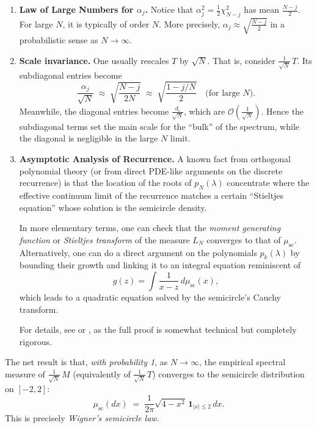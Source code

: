 \documentclass[letterpaper,11pt,oneside,reqno]{article}
\numberwithin{equation}{section}
\theoremstyle{definition}
\begin{document}
\begin{enumerate}[1.]
\item \textbf{Law of Large Numbers for \(\alpha_j\).}
   Notice that \(\alpha_j^2 = \tfrac{1}{2}\chi^2_{N-j}\) has mean \(\tfrac{N-j}{2}\).  For large \(N\), it is typically of order \(N\).  More precisely, \(\alpha_j \approx \sqrt{\tfrac{N-j}{2}}\) in a probabilistic sense as \(N\to\infty\).

\item \textbf{Scale invariance.}
   One usually rescales \(T\) by \(\sqrt{N}\).  That is, consider \(\tfrac{1}{\sqrt{N}}\,T\).  Its subdiagonal entries become
   \[
     \frac{\alpha_j}{\sqrt{N}}
     \;\approx\;
     \sqrt{\frac{N-j}{2N}}
     \;\approx\;
     \sqrt{\frac{1-j/N}{2}}
     \quad\text{(for large }N\text{)}.
   \]
   Meanwhile, the diagonal entries become \(\tfrac{d_i}{\sqrt{N}}\), which are \(\mathcal{O}(\tfrac{1}{\sqrt{N}})\).  Hence the subdiagonal terms set the main scale for the “bulk” of the spectrum, while the diagonal is negligible in the large \(N\) limit.

\item \textbf{Asymptotic Analysis of Recurrence.}
   A known fact from orthogonal polynomial theory (or from direct PDE-like arguments on the discrete recurrence) is that the location of the roots of \(p_N(\lambda)\) concentrate where the effective continuum limit of the recurrence matches a certain “Stieltjes equation” whose solution is the semicircle density.

   In more elementary terms, one can check that the \emph{moment generating function} or \emph{Stieltjes transform} of the measure \(L_N\) converges to that of \(\mu_{\mathrm{sc}}\).  Alternatively, one can do a direct argument on the polynomials \(p_k(\lambda)\) by bounding their growth and linking it to an integral equation reminiscent of
   \[
     g(z) = \int \frac{1}{x-z}\,d\mu_{\mathrm{sc}}(x),
   \]
   which leads to a quadratic equation solved by the semicircle’s Cauchy transform.

   For details, see \cite{DumitriuEdelman2002} or \cite{TaoTopics}, as the full proof is somewhat technical but completely rigorous.
\end{enumerate}

The net result is that, \emph{with probability 1}, as \(N\to\infty\), the empirical spectral measure of \(\frac{1}{\sqrt{N}}\,M\) (equivalently of \(\frac{1}{\sqrt{N}}\,T\)) converges to the semicircle distribution on \([-2,2]\):
\[
  \mu_{\mathrm{sc}}(dx)
  \;=\;
  \frac{1}{2\pi}\sqrt{4-x^2}\,\mathbf{1}_{|x|\le 2}\,dx.
\]
This is precisely \emph{Wigner’s semicircle law}.
\end{document}
